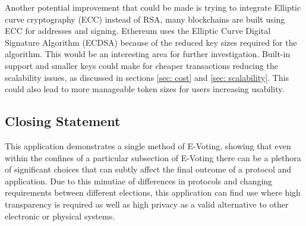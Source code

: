 \documentclass{entcs}
\begin{document}
Another potential improvement that could be made is trying to integrate Elliptic curve cryptography (ECC) instead of RSA, many blockchains are built using ECC for addresses and signing. Ethereum uses the Elliptic Curve Digital Signature Algorithm (ECDSA) because of the reduced key sizes required for the algorithm. This would be an interesting area for further investigation. Built-in support and smaller keys could make for cheaper transactions reducing the scalability issues, as discussed in sections \ref{sec: cost} and \ref{sec: scalability}. This could also lead to more manageable token sizes for users increasing usability.

\subsection{Closing Statement}
This application demonstrates a single method of E-Voting, showing that even within the confines of a particular subsection of E-Voting there can be a plethora of significant choices that can subtly affect the final outcome of a protocol and application. Due to this minutiae of differences in protocols and changing requirements between different elections, this application can find use where high transparency is required as well as high privacy as a valid alternative to other electronic or physical systems.

\renewcommand*{\bibfont}{\footnotesize}
\printbibliography
\end{document}
